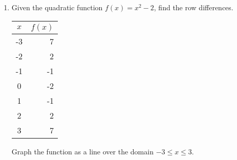 \documentclass[12pt, twoside]{article}
\begin{document}
\begin{enumerate}
          \item Given the quadratic function $f(x)=x^2-2$, find the row differences.
            \renewcommand{\arraystretch}{1.6}
              \begin{center}
                \begin{tabular}{|c|r|}
                \hline
                $x$ & $f(x)$\\
                \hline
                -3 & 7 \\
                \hline
                -2 & 2 \\
                \hline
                -1 & -1 \\
                \hline
                0 & -2 \\
                \hline
                1 & -1 \\
                \hline
                2 & 2 \\
                \hline
                3 & 7 \\
                \hline
                \end{tabular}
              \end{center}
          Graph the function as a line over the domain $-3 \leq x \leq 3$.

          \begin{center} %
          \end{center}


\end{enumerate}
\newpage
\setcounter{page}{1}
\end{document}
